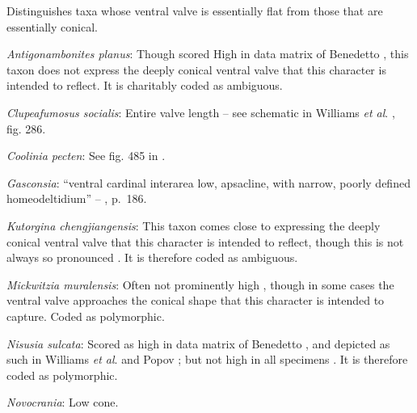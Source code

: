 \documentclass[openany]{book}
\theoremstyle{definition}
\theoremstyle{definition}
\theoremstyle{definition}
\theoremstyle{remark}
\begin{document}
Distinguishes taxa whose ventral valve is essentially flat from those
that are essentially conical.

\hypertarget{Antigonambonites_planus-coding-105}{}
\emph{Antigonambonites planus}: Though scored High in data matrix of
Benedetto \citeyearpar{Benedetto2009iChaniella}, this taxon
\citep[see][fig. 508]{Williams2000LinguliformeaCraniiformea} does not
express the deeply conical ventral valve that this character is intended
to reflect. It is charitably coded as ambiguous.

\hypertarget{Clupeafumosus_socialis-coding-105}{}
\emph{Clupeafumosus socialis}: Entire valve length -- see schematic in
Williams \emph{et al}. \citeyearpar{Williams1997Introduction}, fig. 286.

\hypertarget{Coolinia_pecten-coding-105}{}
\emph{Coolinia pecten}: See fig. 485 in
\citet{Williams2000LinguliformeaCraniiformea}.

\hypertarget{Gasconsia-coding-105}{}
\emph{Gasconsia}: ``ventral cardinal interarea low, apsacline, with
narrow, poorly defined homeodeltidium'' --
\citet{Williams2000LinguliformeaCraniiformea}, p.~186.

\hypertarget{Kutorgina_chengjiangensis-coding-105}{}
\emph{Kutorgina chengjiangensis}: This taxon
\citetext{\citealp[see][fig.
129]{Williams2000LinguliformeaCraniiformea}; \citealp[fig.
1]{Popov1992TheCambrian}} comes close to expressing the deeply conical
ventral valve that this character is intended to reflect, though this is
not always so pronounced \citep[e.g.][fig.
125]{Williams2000LinguliformeaCraniiformea}. It is therefore coded as
ambiguous.

\hypertarget{Mickwitzia_muralensis-coding-105}{}
\emph{Mickwitzia muralensis}: Often not prominently high
\citep{Skovsted2003EarlyCambrian, Balthasar2004Shellstructure}, though
in some cases \citep[e.g.][]{Butler2015Exceptionallypreserved} the
ventral valve approaches the conical shape that this character is
intended to capture. Coded as polymorphic.

\hypertarget{Nisusia_sulcata-coding-105}{}
\emph{Nisusia sulcata}: Scored as high in data matrix of Benedetto
\citeyearpar{Benedetto2009iChaniella}, and depicted as such in Williams
\emph{et al}. \citeyearpar[fig.
125]{Williams2000LinguliformeaCraniiformea} and Popov \citeyearpar[fig.
1]{Popov1992TheCambrian}; but not high in all specimens
\citep[e.g.][fig. 126]{Williams2000LinguliformeaCraniiformea}. It is
therefore coded as polymorphic.

\hypertarget{Novocrania-coding-105}{}
\emph{Novocrania}: Low cone.
\end{document}
